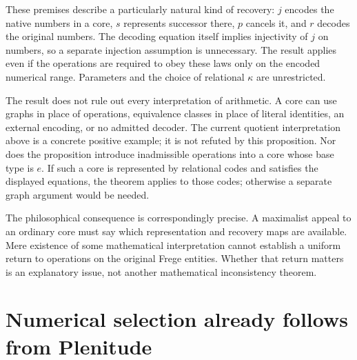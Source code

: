 \documentclass[11pt]{article}
\begin{document}
These premises describe a particularly natural kind of recovery: $j$ encodes the native numbers in a core, $s$ represents successor there, $p$ cancels it, and $r$ decodes the original numbers. The decoding equation itself implies injectivity of $j$ on numbers, so a separate injection assumption is unnecessary. The result applies even if the operations are required to obey these laws only on the encoded numerical range. Parameters and the choice of relational $\kappa$ are unrestricted.

The result does not rule out every interpretation of arithmetic. A core can use graphs in place of operations, equivalence classes in place of literal identities, an external encoding, or no admitted decoder. The current quotient interpretation above is a concrete positive example; it is not refuted by this proposition. Nor does the proposition introduce inadmissible operations into a core whose base type is $e$. If such a core is represented by relational codes and satisfies the displayed equations, the theorem applies to those codes; otherwise a separate graph argument would be needed.

The philosophical consequence is correspondingly precise. A maximalist appeal to an ordinary core must say which representation and recovery maps are available. Mere existence of some mathematical interpretation cannot establish a uniform return to operations on the original Frege entities. Whether that return matters is an explanatory issue, not another mathematical inconsistency theorem.

\section{Numerical selection already follows from Plenitude}
\end{document}
